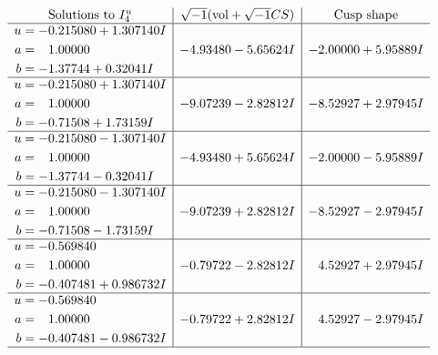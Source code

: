 \documentclass[1p]{elsarticle_modified}
\theoremstyle{definition}
\newcommand{\I}{\sqrt{-1}}
\begin{document}
$$\begin{array}{c|c|c}  
\text{Solutions to }I^u_{4}& \I (\text{vol} + \sqrt{-1}CS) & \text{Cusp shape}\\
 \hline 
\begin{aligned}
u &= -0.215080 + 1.307140 I \\
a &= \phantom{-}1.00000\phantom{ +0.000000I} \\
b &= -1.37744 + 0.32041 I\end{aligned}
 & -4.93480 - 5.65624 I & -2.00000 + 5.95889 I \\ \hline\begin{aligned}
u &= -0.215080 + 1.307140 I \\
a &= \phantom{-}1.00000\phantom{ +0.000000I} \\
b &= -0.71508 + 1.73159 I\end{aligned}
 & -9.07239 - 2.82812 I & -8.52927 + 2.97945 I \\ \hline\begin{aligned}
u &= -0.215080 - 1.307140 I \\
a &= \phantom{-}1.00000\phantom{ +0.000000I} \\
b &= -1.37744 - 0.32041 I\end{aligned}
 & -4.93480 + 5.65624 I & -2.00000 - 5.95889 I \\ \hline\begin{aligned}
u &= -0.215080 - 1.307140 I \\
a &= \phantom{-}1.00000\phantom{ +0.000000I} \\
b &= -0.71508 - 1.73159 I\end{aligned}
 & -9.07239 + 2.82812 I & -8.52927 - 2.97945 I \\ \hline\begin{aligned}
u &= -0.569840\phantom{ +0.000000I} \\
a &= \phantom{-}1.00000\phantom{ +0.000000I} \\
b &= -0.407481 + 0.986732 I\end{aligned}
 & -0.79722 - 2.82812 I & \phantom{-}4.52927 + 2.97945 I \\ \hline\begin{aligned}
u &= -0.569840\phantom{ +0.000000I} \\
a &= \phantom{-}1.00000\phantom{ +0.000000I} \\
b &= -0.407481 - 0.986732 I\end{aligned}
 & -0.79722 + 2.82812 I & \phantom{-}4.52927 - 2.97945 I\\
 \hline 
 \end{array}$$\newpage\newpage\renewcommand{\arraystretch}{1}
\end{document}
